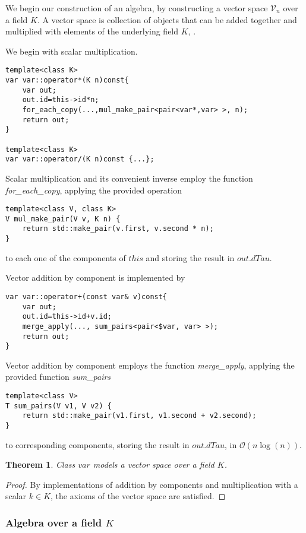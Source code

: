 \documentclass{article}
\newcommand{\VV}{\mathcal{V}}
\newtheorem{izrek}{Theorem}[section]
\begin{document}
We begin our construction of an algebra, by constructing a vector space $\VV_n$ over a field $K$. A vector space is collection of objects that can be added together and multiplied with elements of the underlying field $K$, .

We begin with scalar multiplication.

\begin{lstlisting}
template<class K>
var var::operator*(K n)const{
    var out;
    out.id=this->id*n;
    for_each_copy(...,mul_make_pair<pair<var*,var> >, n);
    return out;
}

template<class K>
var var::operator/(K n)const {...};
\end{lstlisting}
Scalar multiplication and its convenient inverse employ the function \emph{for\_each\_copy}, applying the provided operation 
\begin{lstlisting}
template<class V, class K>
V mul_make_pair(V v, K n) {
    return std::make_pair(v.first, v.second * n);
}
\end{lstlisting}
to each one of the components of $this$ and storing the result in $out.dTau$.

Vector addition by component is implemented by 
\begin{lstlisting}
var var::operator+(const var& v)const{
    var out;
    out.id=this->id+v.id;
    merge_apply(..., sum_pairs<pair<$var, var> >);
    return out;
}
\end{lstlisting}
Vector addition by component employs the function \emph{merge\_apply}, applying the provided function \emph{sum\_pairs}
\begin{lstlisting}
template<class V>
T sum_pairs(V v1, V v2) {
    return std::make_pair(v1.first, v1.second + v2.second);
}
\end{lstlisting}
to corresponding components, storing the result in $out.dTau$, in $\mathcal{O}(n\log(n))$.

\begin{izrek}
Class $var$ models a vector space over a field $K$.
\end{izrek}
\begin{proof}
By implementations of addition by components and multiplication with a scalar $k\in K$, the axioms of the vector space are satisfied.
\end{proof}

\subsubsection{Algebra over a field $K$}\label{sec:algebra}
\end{document}
